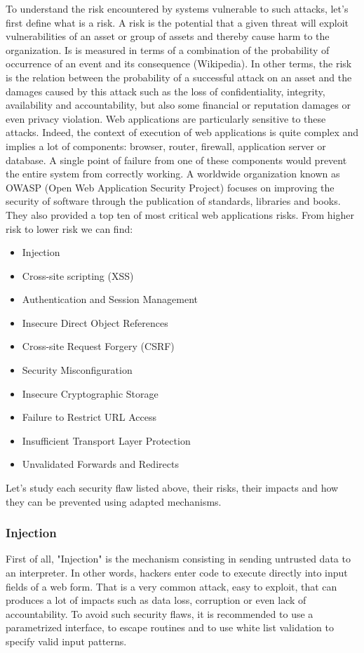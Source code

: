 To understand the risk encountered by systems vulnerable to such attacks,
let's first define what is a risk. A risk is the potential that a given threat
will exploit vulnerabilities of an asset or group of assets and thereby cause
harm to the organization. Is is measured in terms of a combination of the
probability of occurrence of an event and its consequence (Wikipedia). In
other terms, the risk is the relation between the probability of a successful
attack on an asset and the damages caused by this attack such as the loss of
confidentiality, integrity, availability and accountability, but also some
financial or reputation damages or even privacy violation.
Web applications are particularly sensitive to these attacks. Indeed, the
context of execution of web applications is quite complex and implies a lot of
components: browser, router, firewall, application server or database. A
single point of failure from one of these components would prevent the entire
system from correctly working. A worldwide organization known as OWASP (Open
Web Application Security Project) focuses on improving the security of
software through the publication of standards, libraries and books. They also
provided a top ten of most critical web applications risks. From higher risk
to lower risk we can find:
\begin{itemize}{}
\item Injection
\item Cross-site scripting (XSS)
\item Authentication and Session Management
\item Insecure Direct Object References
\item Cross-site Request Forgery (CSRF)
\item Security Misconfiguration
\item Insecure Cryptographic Storage
\item Failure to Restrict URL Access
\item Insufficient Transport Layer Protection
\item Unvalidated Forwards and Redirects
\end{itemize}

Let's study each security flaw listed above, their risks, their impacts and
how they can be prevented using adapted mechanisms.

\subsubsection{Injection}
First of all, "Injection" is the mechanism consisting in sending untrusted
data to an interpreter. In other words, hackers enter code to execute directly
into input fields of a web form. That is a very common attack, easy to
exploit, that can produces a lot of impacts such as data loss, corruption or
even lack of accountability. To avoid such security flaws, it is recommended
to use a parametrized interface, to escape routines and to use white list
validation to specify valid input patterns.

